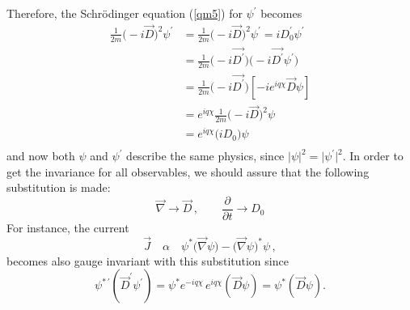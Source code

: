 Therefore, the Schrödinger equation (\ref{qm5}) for $\psi^{'}$ becomes 
\begin{equation} \label{qm10}
\begin{split}
\frac{1}{2m}\big(-i\vec{D}\big)^2\psi^{'} & = \frac{1}{2m}\big(-i\vec{D}\big)^2\psi^{'} = iD^{'}_0\psi^{'} \\
 & = \frac{1}{2m}\big(-i\vec{D^{'}}\big)\big(-i\vec{D^{'}}\psi^{'}\big)\\
 & = \frac{1}{2m}\big(-i\vec{D^{'}}\big)\left[-ie^{iq\chi} \vec{D}\psi\right]\\
 & = e^{iq\chi}\frac{1}{2m}\big(-i\vec{D}\big)^{2}\psi\\
 & = e^{iq\chi}\big(iD_0\big)\psi\\
\end{split}
\end{equation}
and now both $\psi$ and $\psi^{'}$ describe the same physics, since $ \vert\psi\vert^2 = \vert\psi^{'}\vert^2$. In order to get the invariance for all observables, we should assure that the following substitution is made:
$$\vec{\nabla} \to \vec{D}\,, \qquad \frac{\partial}{\partial t} \to D_0 $$
For instance, the current
$$\vec{J}\quad \alpha\quad \psi^{*}\big(\vec{\nabla}\psi\big) - \big(\vec{\nabla}\psi\big)^{*}\psi \,,$$
becomes also gauge invariant with this substitution since
\begin{equation} \label{qm11}
\psi^{*\,'} \left( \vec{D}^{'}\psi^{'}  \right) = \psi^{*} e^{-iq\chi}\, e^{iq\chi} \left(\vec{D} \psi \right) = \psi^{*} \left(\vec{D} \psi \right) .
\end{equation}

